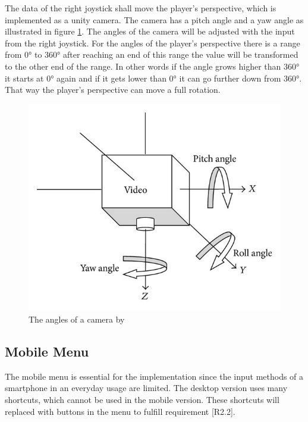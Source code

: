 The data of the right joystick shall move the player's perspective, which is implemented as a \gls{unity} camera.
The camera has a pitch angle and a yaw angle as illustrated in figure \ref{fig:camera}.
The angles of the camera will be adjusted with the input from the right joystick. 
For the angles of the player's perspective there is a range from 0° to 360° after reaching an end of this range the value will be transformed to the other end of the range.
In other words if the angle grows higher than 360° it starts at 0° again and if it gets lower than 0° it can go further down from 360°.
That way the player's perspective can move a full rotation.
\begin{figure}[htb]
    \centering
    \includegraphics[width=1\textwidth]{Implementation/img/pitch_yaw.jpg}
    \caption{The angles of a camera by \cite{Zhang2014}}\label{fig:camera}
\end{figure}

\subsection{Mobile Menu}
\label{sec:menu}

The mobile menu is essential for the implementation since the input methods of a smartphone in an everyday usage are limited.
The desktop version uses many \glspl{shortcut}, which cannot be used in the mobile version.
These \glspl{shortcut} will replaced with buttons in the menu to fulfill requirement [R2.2].

